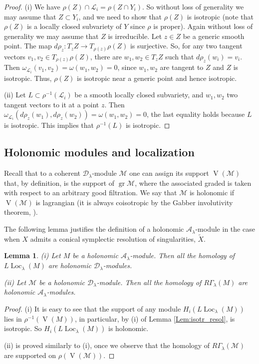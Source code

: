 \documentclass[12pt]{amsart}
\newcommand{\A}{\mathcal{A}}
\newcommand{\VA}{\operatorname{V}}
\newcommand{\gr}{\operatorname{gr}}
\newcommand{\Loc}{\operatorname{Loc}}
\newtheorem{Lem}[Thm]{Lemma}
\theoremstyle{definition}
\begin{document}
\begin{proof} (i) We have $\rho(Z)\cap \mathcal{L}_i=\rho(Z\cap Y_i)$. So without loss of generality
we may assume that $Z\subset Y_i$, and we need to show that $\rho(Z)$ is isotropic
(note that $\rho(Z)$ is a locally closed subvariety of $Y$ since $\rho$ is proper).
Again without loss of generality we may assume that $Z$ is irreducible.
Let $z\in Z$ be a generic smooth point.
The map $d\rho_z: T_zZ\rightarrow T_{\rho(z)}\rho(Z)$ is surjective.
So, for any two tangent vectors $v_1,v_2\in T_{\rho(z)}\rho(Z)$, there are $w_1,w_2\in T_zZ$ such that $d\rho_z(w_i)=v_i$.
Then $\omega_{\mathcal{L}_i}(v_1,v_2)=\omega(w_1,w_2)=0$, since $w_1,w_2$ are tangent to $Z$ and $Z$ is isotropic.
Thus, $\rho(Z)$ is isotropic near a generic point and hence isotropic.

(ii) Let $L\subset \rho^{-1}(\mathcal{L}_i)$ be a smooth locally closed subvariety, and $w_1,w_2$ two tangent vectors to it at a point $z$. Then $\omega_{\mathcal{L}_i}(d\rho_z(w_1),d\rho_z(w_2))=\omega(w_1,w_2)=0$, the last equality
holds because $L$ is isotropic. This implies that $\rho^{-1}(L)$ is isotropic.
\end{proof}

\subsection{Holonomic modules and localization}
Recall that to a coherent $\mathcal{D}_\lambda$-module $\mathcal{M}$ one can assign its support
$\VA(\mathcal{M})$ that, by definition, is the support of $\gr\mathcal{M}$, where the associated
graded is taken with respect to an arbitrary good filtration. We say that $\mathcal{M}$
is holonomic if $\VA(\mathcal{M})$ is lagrangian (it is always coisotropic by the Gabber involutivity theorem,
\cite{Ga}).

The following lemma justifies the definition of a holonomic $\A_\lambda$-module in the case when $X$
admits a conical symplectic resolution of singularities, $\tilde{X}$.

\begin{Lem}\label{Lem:holon_local}
(i) Let $M$ be a holonomic $\A_\lambda$-module. Then all the homology of $L\Loc_\lambda(M)$
are holonomic $\mathcal{D}_\lambda$-modules.

(ii) Let $\mathcal{M}$ be a holonomic $\mathcal{D}_\lambda$-module. Then all the homology
of $R\Gamma_\lambda(M)$ are holonomic $\A_\lambda$-modules.
\end{Lem}
\begin{proof}
(i) It is easy to see that the support of any module $H_i(L\Loc_\lambda(M))$
lies in $\rho^{-1}(\VA(M))$, in particular, by (i) of  Lemma \ref{Lem:isotr_resol}, is isotropic.
So $H_i(L\Loc_\lambda(M))$ is holonomic.

(ii) is proved similarly to (i), once we observe that the homology of $R\Gamma_\lambda(\mathcal{M})$
are supported on $\rho(\VA(\mathcal{M}))$.
\end{proof}
\end{document}
